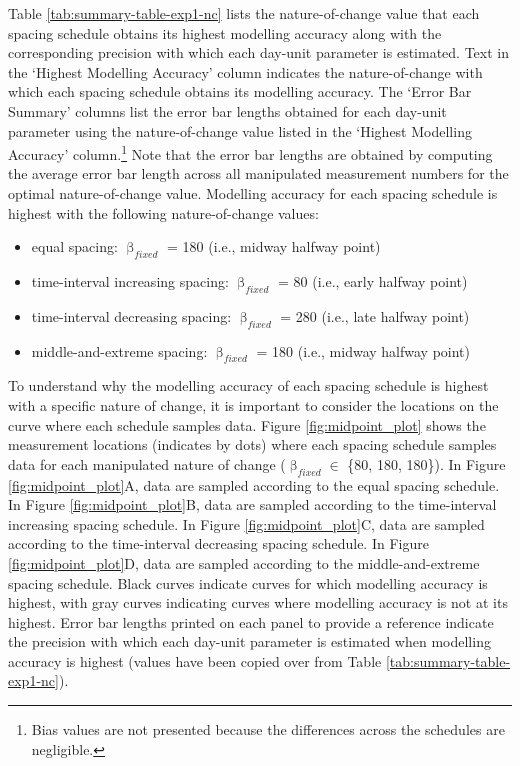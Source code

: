 \documentclass[
12pt, %
twoside,
english]{guelphthesis}
\theoremstyle{definition}
\theoremstyle{definition}
\theoremstyle{definition}
\theoremstyle{definition}
\theoremstyle{remark}
\begin{document}
Table \ref{tab:summary-table-exp1-nc} lists the nature-of-change value that each spacing schedule obtains its highest modelling accuracy along with the corresponding precision with which each day-unit parameter is estimated. Text in the `Highest Modelling Accuracy' column indicates the nature-of-change with which each spacing schedule obtains its modelling accuracy. The `Error Bar Summary' columns list the error bar lengths obtained for each day-unit parameter using the nature-of-change value listed in the `Highest Modelling Accuracy' column.\footnote{Bias values are not presented because the differences across the schedules are negligible.} Note that the error bar lengths are obtained by computing the average error bar length across all manipulated measurement numbers for the optimal nature-of-change value. Modelling accuracy for each spacing schedule is highest with the following nature-of-change values:
\begin{itemize}
\tightlist
\item
  equal spacing: \(\upbeta_{fixed}\) = 180 (i.e., midway halfway point)
\item
  time-interval increasing spacing: \(\upbeta_{fixed}\) = 80 (i.e., early halfway point)
\item
  time-interval decreasing spacing: \(\upbeta_{fixed}\) = 280 (i.e., late halfway point)
\item
  middle-and-extreme spacing: \(\upbeta_{fixed}\) = 180 (i.e., midway halfway point)
\end{itemize}
To understand why the modelling accuracy of each spacing schedule is highest with a specific nature of change, it is important to consider the locations on the curve where each schedule samples data. Figure \ref{fig:midpoint_plot} shows the measurement locations (indicates by dots) where each spacing schedule samples data for each manipulated nature of change (\(\upbeta_{fixed} \in\) \{80, 180, 180\}). In Figure \ref{fig:midpoint_plot}A, data are sampled according to the equal spacing schedule. In Figure \ref{fig:midpoint_plot}B, data are sampled according to the time-interval increasing spacing schedule. In Figure \ref{fig:midpoint_plot}C, data are sampled according to the time-interval decreasing spacing schedule. In Figure \ref{fig:midpoint_plot}D, data are sampled according to the middle-and-extreme spacing schedule. Black curves indicate curves for which modelling accuracy is highest, with gray curves indicating curves where modelling accuracy is not at its highest. Error bar lengths printed on each panel to provide a reference indicate the precision with which each day-unit parameter is estimated when modelling accuracy is highest (values have been copied over from Table \ref{tab:summary-table-exp1-nc}).
\end{document}
